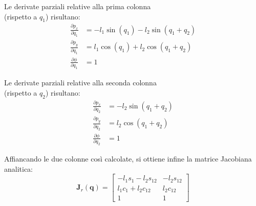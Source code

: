 \documentclass[11pt, a4paper]{report}
\begin{document}
\noindent
\begin{minipage}{0.48\textwidth}
    Le derivate parziali relative alla prima colonna\\
    (rispetto a \(q_1\)) risultano:
    \begin{align*}
        \frac{\partial p_x}{\partial q_1} &= -l_1 \sin(q_1) - l_2 \sin(q_1+q_2) \\
        \frac{\partial p_y}{\partial q_1} &= l_1 \cos(q_1) + l_2 \cos(q_1+q_2) \\
        \frac{\partial \phi}{\partial q_1} &= 1
    \end{align*}
\end{minipage}
\hfill
\begin{minipage}{0.48\textwidth}
    Le derivate parziali relative alla seconda colonna\\
    (rispetto a \(q_2\)) risultano:
    \begin{align*}
        \frac{\partial p_x}{\partial q_2} &= -l_2 \sin(q_1+q_2) \\
        \frac{\partial p_y}{\partial q_2} &= l_2 \cos(q_1+q_2) \\
        \frac{\partial \phi}{\partial q_2} &= 1
    \end{align*}
\end{minipage}

Affiancando le due colonne così calcolate, si ottiene infine la matrice Jacobiana analitica:
\[
    \bm{J}_r(\bm{q}) =
    \begin{bmatrix}
        -l_1 s_1 - l_2 s_{12} & -l_2 s_{12} \\
        l_1 c_1 + l_2 c_{12} & l_2 c_{12} \\
        1 & 1
    \end{bmatrix}
\]
\newpage
\end{document}
